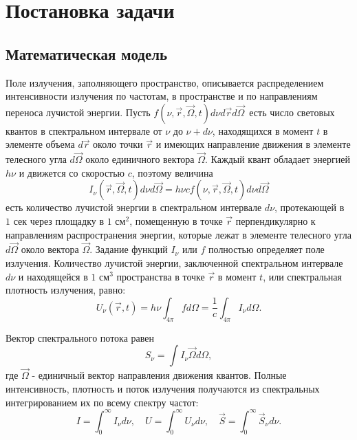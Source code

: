 \chapter{Постановка задачи}

\section{Математическая модель}
Поле излучения, заполняющего пространство, описывается распределением интенсивности излучения по частотам, в пространстве и по направлениям переноса лучистой энергии. Пусть $f(\nu, \vec r, \vec \Omega, t)d\nu d\vec r d \vec \Omega \, $ есть число световых квантов в спектральном интервале от $ \nu$ до $ \nu + d\nu$, находящихся в момент $t$ в элементе объема $d\vec r$ около точки $\vec r$ и имеющих направление движения в элементе телесного угла $d\vec \Omega$ около единичного вектора $\vec \Omega$. 
Каждый квант обладает энергией $h \nu$ и движется со скоростью $c$, поэтому величина 
\begin {equation}
I_{\nu} (\vec r, \vec \Omega, t)d \nu d\vec \Omega = h\nu c f (\nu, \vec r, \vec \Omega, t)d\nu d\vec{\Omega}
\end {equation}
есть количество лучистой энергии в спектральном интервале $d\nu$, протекающей в $1 \text{ сек}$ через площадку в $1 \text{ см}^2$, помещенную в точке $\vec r$ перпендикулярно к направлениям распространения энергии, которые лежат в элементе телесного угла $d\vec\Omega$ около вектора $\vec \Omega$. Задание функций $I_{\nu}$ или $f$ полностью определяет поле излучения. Количество лучистой энергии, заключенной  спектральном интервале $d\nu$ и находящейся в $1 \text{ см}^3$ пространства в точке $\vec r$ в момент $t$, или спектральная плотность излучения, равно:
\begin {equation}
U_\nu (\vec r, t) = h \nu \int_{4 \pi} f d \Omega = \frac{1}{c} \int_{4\pi} I_{\nu} d\Omega.
\end {equation}

Вектор спектрального потока равен 
\begin {equation}
S_{\nu} = \int I_{\nu}\vec\Omega d\Omega,
\end {equation}
где $\vec\Omega$ - единичный вектор направления движения квантов. 
Полные интенсивность, плотность и поток излучения получаются из спектральных интегрированием их по всему спектру частот:
\begin {equation}
I = \int_0^\infty I_{\nu} d\nu, \quad U = \int_0^\infty U_{\nu}d\nu, \quad \vec S =  \int_0^\infty \vec S_{\nu}d\nu.
\end {equation}
